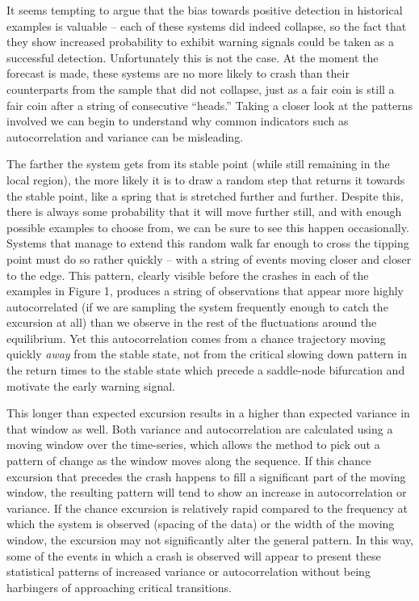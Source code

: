 \documentclass[authoryear,review,12pt]{elsarticle}
\begin{document}
It seems tempting to argue that the bias towards positive detection
in historical examples is valuable -- each of these systems did
indeed collapse, so the fact that they show increased probability
to exhibit warning signals could be taken as a successful detection.
Unfortunately this is not the case. At the moment the forecast is made,
these systems are no more likely to crash than their counterparts from
the sample that did not collapse, just as a fair coin is still a fair
coin after a string of consecutive ``heads.''  Taking a closer look at
the patterns involved we can begin to understand why common indicators
such as autocorrelation and variance can be misleading.

The farther the system gets from its stable point (while still remaining
in the local region), the more likely it is to draw a random step that
returns it towards the stable point, like a spring that is stretched
further and further. Despite this, there is always some probability that
it will move further still, and with enough possible examples to choose
from, we can be sure to see this happen occasionally.  Systems that manage
to extend this random walk far enough to cross the tipping point must do
so rather quickly -- with a string of events moving closer and closer to
the edge.  This pattern, clearly visible before the crashes in each of
the examples in Figure 1, produces a string of observations that appear
more highly autocorrelated (if we are sampling the system frequently
enough to catch the excursion at all) than we observe in the rest of the
fluctuations around the equilibrium.  Yet this autocorrelation comes from
a chance trajectory moving quickly \emph{away} from the stable state,
not from the critical slowing down pattern in the return times to the
stable state which precede a saddle-node bifurcation and motivate the
early warning signal.


This longer than expected excursion results in a higher than expected
variance in that window as well. Both variance and autocorrelation are
calculated using a moving window over the time-series, which allows
the method to pick out a pattern of change as the window moves along
the sequence. If this chance excursion that precedes the crash happens
to fill a significant part of the moving window, the resulting pattern
will tend to show an increase in autocorrelation or variance.  If the
chance excursion is relatively rapid compared to the frequency at which
the system is observed (spacing of the data) or the width of the moving
window, the excursion may not significantly alter the general pattern.
In this way, some of the events in which a crash is observed will
appear to present these statistical patterns of increased variance
or autocorrelation without being harbingers of approaching critical
transitions.
\end{document}
